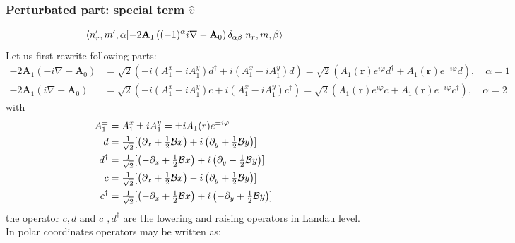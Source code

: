 \documentclass[a4paper,article,14pt]{extarticle}
\begin{document}
\subsubsection{Perturbated part: special term $\hat v$}
\begin{equation}
\mel{n'_r, m', \alpha} { - 2 \mathbf{A}_1 \left( (-1)^{\alpha} i \nabla - \mathbf{A}_0 \right) \delta_{\alpha \beta}} {n_r, m, \beta}
\end{equation}
Let us first rewrite following parts:
\begin{equation}
\begin{aligned}
-2 \mathbf{A}_1  (-i \nabla - \mathbf{A}_0 ) &= \sqrt{2} \left( -i(A_{1}^{x} + i A_{1}^{y})d^{\dagger} + i(A_{1}^{x} - i A_{1}^{y}) d \right)= \sqrt{2} \left( A_{1} (\mathbf{r}) e^{ i \varphi  } d^{\dagger} +  A_{1} (\mathbf{r}) e^{-i \varphi  } d \right), \quad \alpha = 1 \\
-2 \mathbf{A}_1  (i \nabla - \mathbf{A}_0 ) &=\sqrt{2} \left( -i(A_{1}^{x} + i A_{1}^{y})c + i(A_{1}^{x} - i A_{1}^{y}) c^{\dagger} \right)= \sqrt{2} \left( A_{1} (\mathbf{r}) e^{  i \varphi  } c^{} +  A_{1} (\mathbf{r}) e^{-i \varphi  } c^{\dagger} \right) , \quad \alpha = 2
\end{aligned}
\end{equation}
with 
\begin{equation}
\begin{aligned}
A^{\pm}_{1}  & = A_{1}^{x} \pm i A_{1}^{y} = \pm i A_1 (r) e^{ \pm i \varphi  }    \\
d  & =  \tfrac{1}{\sqrt{2}} [  \left(\partial_{x} + \tfrac 12 {\cal B} x  \right) + i   \left(  \partial_{y} + \tfrac 12 {\cal B} y\right) ] \\
d^{\dagger}  & =  \tfrac{1}{\sqrt{2}} [ \left( - \partial_{x} + \tfrac 12 {\cal B} x \right) + i   \left( \partial_{y} - \tfrac 12 {\cal B} y  \right) ] \\
c  & =  \tfrac{1}{\sqrt{2}} [  \left(\partial_{x} + \tfrac 12 {\cal B} x  \right) - i   \left(  \partial_{y} + \tfrac 12 {\cal B} y\right) ] \\
c^{\dagger}  & =  \tfrac{1}{\sqrt{2}} [ \left( - \partial_{x} + \tfrac 12 {\cal B} x \right) + i   \left( - \partial_{y} + \tfrac 12 {\cal B} y  \right) ]
\end{aligned}
\end{equation} 
the operator $c,d$ and $c^{\dagger},d^{\dagger} $ are the lowering and raising operators in Landau level.
In polar coordinates operators may be written as:
\end{document}
